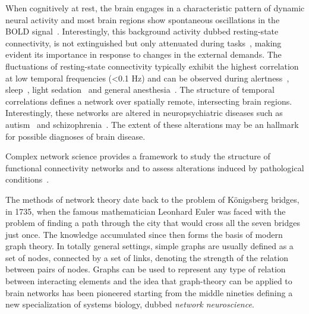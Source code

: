 When cognitively at rest, the brain engages in a characteristic pattern of dynamic neural activity and most brain regions show spontaneous oscillations in the BOLD signal~\cite{biswal1995,raichle2001,gusnard2001}. Interestingly, this background activity dubbed resting-state connectivity, is not extinguished but only attenuated during tasks~\cite{fransson2006}, making evident its importance in response to changes in the external demands. The fluctuations of resting-state connectivity typically exhibit the highest correlation at low temporal frequencies (<0.1 Hz) and can be observed during alertness~\cite{fox2006}, sleep~\cite{horovitz2009}, light sedation~\cite{greicius2008} and general anesthesia~\cite{martuzzi2010}.
The structure of temporal correlations defines a network over spatially remote,  intersecting brain regions. 
Interestingly, these networks are altered in neuropsychiatric diseases such as autism~\cite{rudie2013} and schizophrenia~\cite{vandenheuvel2014}.
The extent of these alterations may be an hallmark for possible diagnoses of brain disease.



Complex network science provides a framework to study the structure of functional connectivity networks and to assess alterations induced by pathological conditions~\cite{bullmore2009,stam2014,crossley2014}.


The methods of network theory date back to the problem of K{\"o}nigsberg bridges, in 1735, when the famous mathematician Leonhard Euler was faced with the problem of finding a path through the city that would cross all the seven bridges just once.
The knowledge accumulated since then forms the basis of modern graph theory.
In totally general settings, simple graphs are usually defined as a set of nodes,  connected by a set of links, denoting the strength of the relation between pairs of nodes.
Graphs can be used to represent any type of relation between interacting elements and the idea that graph-theory can be applied to brain networks has been pioneered starting from the middle nineties defining a new specialization of systems biology, dubbed \emph{network neuroscience}.

